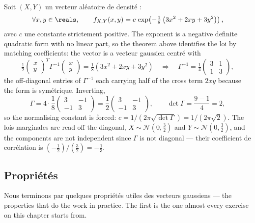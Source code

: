 \begin{example}
Soit $(X,Y)$ un vecteur aléatoire de densité :
\[
  \forall x,y \in \reals, \qquad
  f_{X,Y}(x,y) = c\,\exp\!\left(-\tfrac{1}{8}\left(3x^{2} + 2xy + 3y^{2}\right)\right) ,
\]
avec $c$ une constante strictement positive. The exponent is a negative definite
quadratic form with no linear part, so the theorem above identifies the
loi by matching coefficients: the vector is a vecteur gaussien centré with
\[
  \tfrac{1}{2}\begin{pmatrix} x \\ y \end{pmatrix}^{T} \Gamma^{-1}
  \begin{pmatrix} x \\ y \end{pmatrix}
  = \tfrac{1}{8}\left(3x^{2} + 2xy + 3y^{2}\right)
  \quad\Longrightarrow\quad
  \Gamma^{-1} = \tfrac{1}{4}\begin{pmatrix} 3 & 1 \\ 1 & 3 \end{pmatrix} ,
\]
the off-diagonal entries of $\Gamma^{-1}$ each carrying half of the cross term
$2xy$ because the form is symétrique. Inverting,
\[
  \Gamma = 4 \cdot \frac{1}{8}\begin{pmatrix} 3 & -1 \\ -1 & 3 \end{pmatrix}
         = \frac{1}{2}\begin{pmatrix} 3 & -1 \\ -1 & 3 \end{pmatrix},
  \qquad \det\Gamma = \frac{9-1}{4} = 2 ,
\]
so the normalising constant is forced:
$c = 1/\left(2\pi\sqrt{\det\Gamma}\right) = 1/(2\pi\sqrt{2})$. The lois
marginales are read off the diagonal, $X \sim \mathcal{N}(0,\tfrac{3}{2})$ and
$Y \sim \mathcal{N}(0,\tfrac{3}{2})$, and the components are not independent
since $\Gamma$ is not diagonal --- their coefficient de corrélation is
$(-\tfrac{1}{2})/(\tfrac{3}{2}) = -\tfrac{1}{3}$.
\end{example}

\subsection{Propriétés}

Nous terminons par quelques propriétés utiles des vecteurs gaussiens --- the
properties that do the work in practice. The first is the one almost every
exercise on this chapter starts from.

